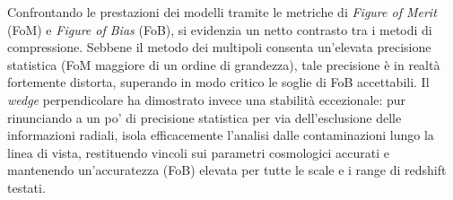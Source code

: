 \documentclass[11pt,a4paper]{article}
\begin{document}
Confrontando le prestazioni dei modelli tramite le metriche di \textit{Figure of Merit} (FoM) e \textit{Figure of Bias} (FoB), si evidenzia un netto contrasto tra i metodi di compressione. Sebbene il metodo dei multipoli consenta un'elevata precisione statistica (FoM maggiore di un ordine di grandezza), tale precisione è in realtà fortemente distorta, superando in modo critico le soglie di FoB accettabili. Il \textit{wedge} perpendicolare ha dimostrato invece una stabilità eccezionale: pur rinunciando a un po' di precisione statistica per via dell'esclusione delle informazioni radiali, isola efficacemente l'analisi dalle contaminazioni lungo la linea di vista, restituendo vincoli sui parametri cosmologici accurati e mantenendo un'accuratezza (FoB) elevata per tutte le scale e i range di redshift testati.
\end{document}
